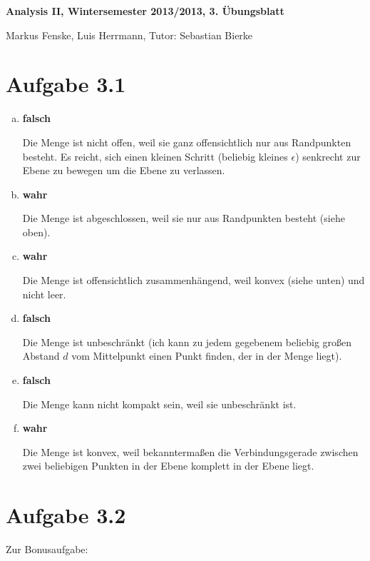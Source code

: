 \documentclass[a4paper,german,12pt,smallheadings]{scrartcl}
\begin{document}
\begin{center}
\bfseries %
\sffamily %
\vspace{-40pt}
Analysis II, Wintersemester 2013/2013, 3. Übungsblatt

Markus Fenske, Luis Herrmann, Tutor: Sebastian Bierke
\vspace{-10pt}
\end{center}

\section*{Aufgabe 3.1}
\begin{enumerate}[a)]
  \item
    \textbf{falsch}

    Die Menge ist nicht offen, weil sie ganz offensichtlich nur aus Randpunkten
    besteht. Es reicht, sich einen kleinen Schritt (beliebig kleines
    $\epsilon$) senkrecht zur Ebene zu bewegen um die Ebene zu verlassen.
  \item
    \textbf{wahr}

    Die Menge ist abgeschlossen, weil sie nur aus Randpunkten besteht (siehe
    oben).
  \item
    \textbf{wahr}

    Die Menge ist offensichtlich zusammenhängend, weil konvex (siehe unten) und
    nicht leer.

  \item
    \textbf{falsch}

    Die Menge ist unbeschränkt (ich kann zu jedem gegebenem beliebig großen
    Abstand $d$ vom Mittelpunkt einen Punkt finden, der in der Menge liegt).

  \item
    \textbf{falsch}

    Die Menge kann nicht kompakt sein, weil sie unbeschränkt ist.
  \item
    \textbf{wahr}

    Die Menge ist konvex, weil bekanntermaßen die Verbindungsgerade zwischen
    zwei beliebigen Punkten in der Ebene komplett in der Ebene liegt.
\end{enumerate}

\section*{Aufgabe 3.2}

Zur Bonusaufgabe:
\end{document}
